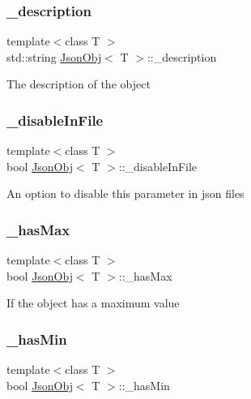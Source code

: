 \subsubsection{\texorpdfstring{\+\_\+description}{\_description}}
{\footnotesize\ttfamily template$<$class T $>$ \\
std\+::string \hyperlink{class_json_obj}{Json\+Obj}$<$ T $>$\+::\+\_\+description\hspace{0.3cm}{\ttfamily [protected]}}

The description of the object \mbox{\label{class_json_obj_a5c945657fed2a1912b0ebdb72c47b810}} 
\subsubsection{\texorpdfstring{\+\_\+disable\+In\+File}{\_disableInFile}}
{\footnotesize\ttfamily template$<$class T $>$ \\
bool \hyperlink{class_json_obj}{Json\+Obj}$<$ T $>$\+::\+\_\+disable\+In\+File\hspace{0.3cm}{\ttfamily [protected]}}

An option to disable this parameter in json files \mbox{\label{class_json_obj_a9936d5baf9c30b7ab500bbc311d50997}} 
\subsubsection{\texorpdfstring{\+\_\+has\+Max}{\_hasMax}}
{\footnotesize\ttfamily template$<$class T $>$ \\
bool \hyperlink{class_json_obj}{Json\+Obj}$<$ T $>$\+::\+\_\+has\+Max\hspace{0.3cm}{\ttfamily [protected]}}

If the object has a maximum value \mbox{\label{class_json_obj_a15a96894dac79c0070170f1e47808ecd}} 
\subsubsection{\texorpdfstring{\+\_\+has\+Min}{\_hasMin}}
{\footnotesize\ttfamily template$<$class T $>$ \\
bool \hyperlink{class_json_obj}{Json\+Obj}$<$ T $>$\+::\+\_\+has\+Min\hspace{0.3cm}{\ttfamily [protected]}}

